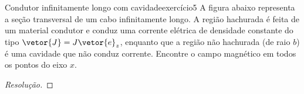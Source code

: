 \begin{exercício}{Condutor infinitamente longo com cavidade}{exercício5}
    A figura abaixo representa a seção transversal de um cabo infinitamente longo. A região hachurada é feita de um material condutor e conduz uma corrente elétrica de densidade constante do tipo \(\vetor{J} = J\vetor{e}_z\), enquanto que a região não hachurada (de raio \(b\)) é uma cavidade que não conduz corrente. Encontre o campo magnético em todos os pontos do eixo \(x\).
    \begin{center}
    \end{center}
\end{exercício}
\begin{proof}[Resolução]

\end{proof}
